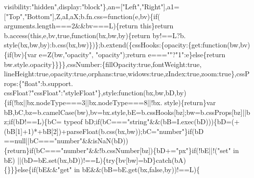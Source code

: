 \begin{DoxyCode}
      visibility:\textcolor{stringliteral}{"hidden"},display:\textcolor{stringliteral}{"block"}\},an=[\textcolor{stringliteral}{"Left"},\textcolor{stringliteral}{"Right"}],a1=[\textcolor{stringliteral}{"Top"},\textcolor{stringliteral}{"Bottom"}],Z,aI,aX;b.fn.css=\textcolor{keyword}{function}(e,bv)\{\textcolor{keywordflow}{if}(
      arguments.length===2&&bv===L)\{\textcolor{keywordflow}{return} \textcolor{keyword}{this}\}\textcolor{keywordflow}{return} b.access(\textcolor{keyword}{this},e,bv,\textcolor{keyword}{true},\textcolor{keyword}{function}(bx,bw,by)\{\textcolor{keywordflow}{return} by!==L?b.
      style(bx,bw,by):b.css(bx,bw)\})\};b.extend(\{cssHooks:\{opacity:\{\textcolor{keyword}{get}:\textcolor{keyword}{function}(bw,bv)\{\textcolor{keywordflow}{if}(bv)\{var e=Z(bw,\textcolor{stringliteral}{"opacity"},\textcolor{stringliteral}{
      "opacity"});\textcolor{keywordflow}{return} e===\textcolor{stringliteral}{""}?\textcolor{stringliteral}{"1"}:e\}\textcolor{keywordflow}{else}\{\textcolor{keywordflow}{return} bw.style.opacity\}\}\}\},cssNumber:\{fillOpacity:\textcolor{keyword}{true},fontWeight:\textcolor{keyword}{true},
      lineHeight:\textcolor{keyword}{true},opacity:\textcolor{keyword}{true},orphans:\textcolor{keyword}{true},widows:\textcolor{keyword}{true},zIndex:\textcolor{keyword}{true},zoom:\textcolor{keyword}{true}\},cssProps:\{\textcolor{stringliteral}{"float"}:b.support.
      cssFloat?\textcolor{stringliteral}{"cssFloat"}:\textcolor{stringliteral}{"styleFloat"}\},style:\textcolor{keyword}{function}(bx,bw,bD,by)\{\textcolor{keywordflow}{if}(!bx||bx.nodeType===3||bx.nodeType===8||!bx.
      style)\{\textcolor{keywordflow}{return}\}var bB,bC,bz=b.camelCase(bw),bv=bx.style,bE=b.cssHooks[bz];bw=b.cssProps[bz]||bz;\textcolor{keywordflow}{if}(bD!==L)\{bC=
      typeof bD;\textcolor{keywordflow}{if}(bC===\textcolor{stringliteral}{"string"}&&(bB=I.exec(bD)))\{bD=(+(bB[1]+1)*+bB[2])+parseFloat(b.css(bx,bw));bC=\textcolor{stringliteral}{"number"}\}\textcolor{keywordflow}{if}(bD
      ==null||bC===\textcolor{stringliteral}{"number"}&&isNaN(bD))\{\textcolor{keywordflow}{return}\}\textcolor{keywordflow}{if}(bC===\textcolor{stringliteral}{"number"}&&!b.cssNumber[bz])\{bD+=\textcolor{stringliteral}{"px"}\}\textcolor{keywordflow}{if}(!bE||!(\textcolor{stringliteral}{"set"} in bE)
      ||(bD=bE.set(bx,bD))!==L)\{\textcolor{keywordflow}{try}\{bv[bw]=bD\}\textcolor{keywordflow}{catch}(bA)\{\}\}\}\textcolor{keywordflow}{else}\{\textcolor{keywordflow}{if}(bE&&\textcolor{stringliteral}{"get"} in bE&&(bB=bE.get(bx,\textcolor{keyword}{false},by))!==L)\{\textcolor{keywordflow}{
}
\end{DoxyCode}

